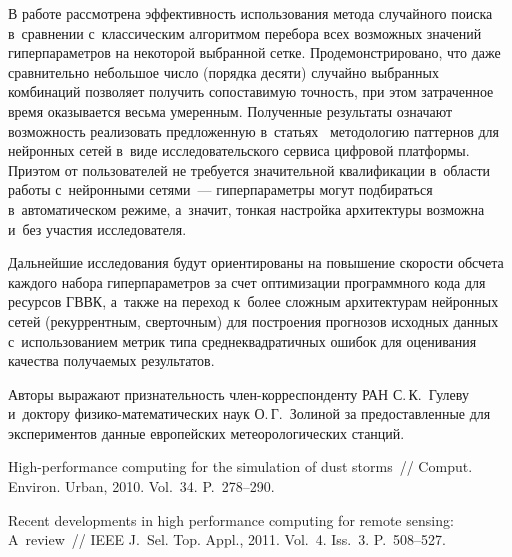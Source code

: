 \begin{multicols}{2}

В работе рассмотрена эффективность использования метода случайного поиска в~сравнении 
с~классическим алгоритмом перебора всех возможных значений гиперпараметров на 
некоторой выбранной сетке. Продемонстрировано, что даже сравнительно небольшое 
число (порядка десяти) случайно выбранных комбинаций позволяет получить 
сопоставимую точность, при этом затраченное время оказывается весьма умеренным. 
Полученные результаты означают возможность реализовать предложенную 
в~статьях~\cite{Gorshenin2017a,Gorshenin2018} методологию паттернов 
для нейронных сетей в~виде ис\-сле\-до\-ва\-тельского сервиса цифровой платформы. 
При\linebreak этом от пользователей не требуется значительной ква\-ли\-фикации в~об\-ласти 
работы с~нейронными се\-тя\-ми~--- гиперпараметры могут подбираться в~автоматическом 
режиме, а~значит, тонкая настройка архитектуры возможна и~без участия исследователя.

Дальнейшие исследования будут ориентированы на повышение ско\-рости 
обсчета каждого набора гиперпараметров за счет оптимизации про\-граммного 
кода для ресурсов ГВВК, а~так\-же на переход к~более сложным архитектурам 
нейронных сетей (рекуррентным, сверточным) для по\-стро\-ения прогнозов исходных 
данных с~использованием мет\-рик типа среднеквадратичных ошибок для оценивания 
качества получаемых результатов.

\smallskip
Авторы выражают признательность член-кор\-рес\-пон\-ден\-ту РАН С.\,К.~Гулеву 
и~доктору фи\-зи\-ко-ма\-те\-ма\-ти\-че\-ских 
наук О.\,Г.~Золиной за предостав\-лен\-ные для экспериментов данные 
европейских метеорологических станций.

\vspace*{-6pt}

{\small\frenchspacing
 {\baselineskip=10.8pt
 \begin{thebibliography}{99}
 
 \vspace*{-2pt}
High-performance computing for the simulation of dust storms~// 
Comput. Environ. Urban, 2010. Vol.~34. P.~278--290.

Recent developments in high performance computing for remote sensing:
A~review~// IEEE J.~Sel. Top. Appl., 2011. Vol.~4. Iss.~3. P.~508--527.


\end{thebibliography}}}
\end{multicols}
